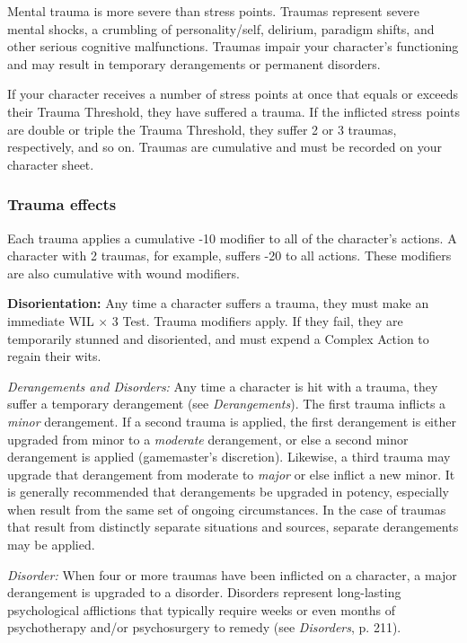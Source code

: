 Mental trauma is more severe than stress points. Traumas represent severe mental shocks, a crumbling of personality/self, delirium, paradigm shifts, and other serious cognitive malfunctions. Traumas impair your character’s functioning and may result in temporary derangements or permanent disorders. 

If your character receives a number of stress points at once that equals or exceeds their Trauma Threshold, they have suffered a trauma. If the inflicted stress points are double or triple the Trauma Threshold, they suffer 2 or 3 traumas, respectively, and so on. Traumas are cumulative and must be recorded on your character sheet. 

\subsubsection{Trauma effects} 

Each trauma applies a cumulative -10 modifier to all of the character’s actions. A character with 2 traumas, for example, suffers -20 to all actions. These modifiers are also cumulative with wound modifiers. 

\textbf{Disorientation:} Any time a character suffers a trauma, they must make an immediate WIL $\times$ 3 Test. Trauma modifiers apply. If they fail, they are temporarily stunned and disoriented, and must expend a Complex Action to regain their wits. 

\emph{Derangements and Disorders:} Any time a character is hit with a trauma, they suffer a temporary derangement (see \emph{Derangements}). The first trauma inflicts a \emph{minor} derangement. If a second trauma is applied, the first derangement is either upgraded from minor to a \emph{moderate} derangement, or else a second minor derangement is applied (gamemaster’s discretion). Likewise, a third trauma may upgrade that derangement from moderate to \emph{major} or else inflict a new minor. It is generally recommended that derangements be upgraded in potency, especially when result from the same set of ongoing circumstances. In the case of traumas that result from distinctly separate situations and sources, separate derangements may be applied. 

\emph{Disorder:} When four or more traumas have been inflicted on a character, a major derangement is upgraded to a disorder. Disorders represent long-lasting psychological afflictions that typically require weeks or even months of psychotherapy and/or psychosurgery to remedy (see \emph{Disorders}, p. 211). 



